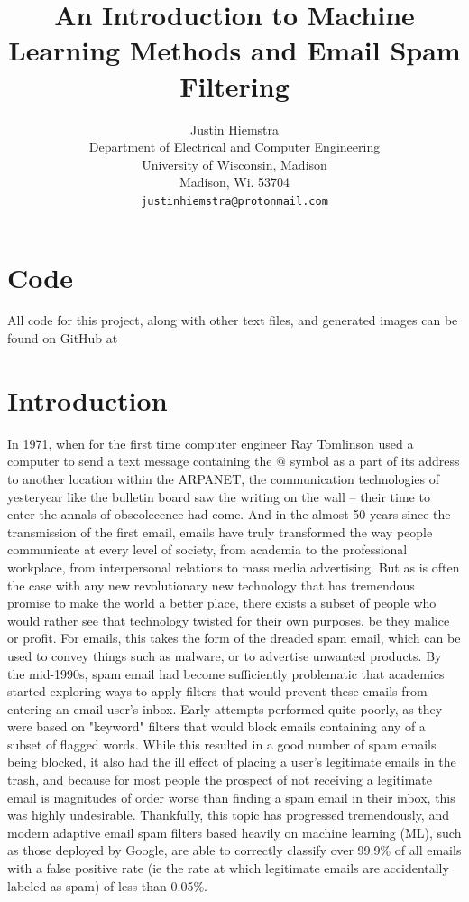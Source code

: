 \documentclass{article}
\title{An Introduction to Machine Learning Methods and Email Spam Filtering}
\author{%
 Justin Hiemstra \\
  Department of Electrical and Computer Engineering\\
  University of Wisconsin, Madison\\
  Madison, Wi. 53704 \\
  \texttt{justinhiemstra@protonmail.com} \\
}
\begin{document}
\maketitle

\section{Code}
All code for this project, along with other text files, and generated images can be found on GitHub at
\section{Introduction}
In 1971, when for the first time computer engineer Ray Tomlinson used a computer to send a text message containing the @ symbol as a part of its address to another location within the ARPANET, the communication technologies of yesteryear like the bulletin board saw the writing on the wall -- their time to enter the annals of obscolecence had come.  And in the almost 50 years since the transmission of the first email, emails have truly transformed the way people communicate at every level of society, from academia to the professional workplace, from interpersonal relations to mass media advertising. But as is often the case with any new revolutionary new technology that has tremendous promise to make the world a better place, there exists a subset of people who would rather see that technology twisted for their own purposes, be they malice or profit. For emails, this takes the form of the dreaded spam email, which can be used to convey things such as malware, or to advertise unwanted products. By the mid-1990s, spam email had become sufficiently problematic that academics started exploring ways to apply filters that would prevent these emails from entering an email user's inbox. Early attempts performed quite poorly, as they were based on "keyword" filters that would block emails containing any of a subset of flagged words. While this resulted in a good number of spam emails being blocked, it also had the ill effect of placing a user's legitimate emails in the trash, and because for most people the prospect of not receiving a legitimate email is magnitudes of order worse than finding a spam email in their inbox, this was highly undesirable\cite{Livingston2002}. Thankfully, this topic has progressed tremendously, and modern adaptive email spam filters based heavily on machine learning (ML), such as those deployed by Google, are able to correctly classify over 99.9\% of all emails with a false positive rate (ie the rate at which legitimate emails are accidentally labeled as spam) of less than 0.05\%\cite{Metz2015}.
\end{document}
